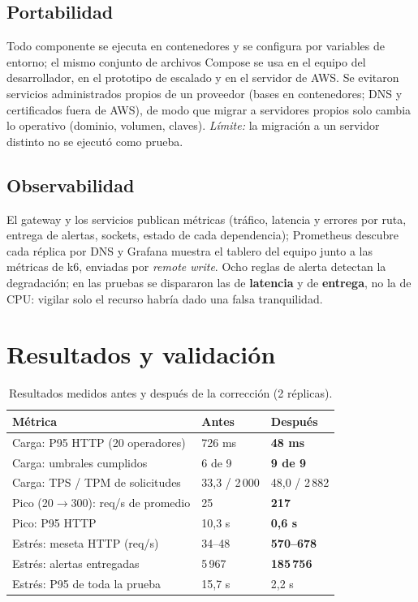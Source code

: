 \documentclass[conference]{IEEEtran}
\begin{document}
\subsection{Portabilidad}
Todo componente se ejecuta en contenedores y se configura por variables de entorno; el mismo conjunto de archivos Compose se usa en el equipo del desarrollador, en el prototipo de escalado y en
el servidor de AWS. Se evitaron servicios administrados propios de un proveedor (bases en contenedores; DNS y certificados fuera de AWS), de modo que migrar a servidores propios solo cambia
lo operativo (dominio, volumen, claves). \emph{Límite:} la migración a un servidor distinto no se ejecutó como prueba.

\subsection{Observabilidad}
El gateway y los servicios publican métricas (tráfico, latencia y errores por ruta, entrega de alertas, sockets, estado de cada dependencia); Prometheus descubre cada réplica por DNS y Grafana
muestra el tablero del equipo junto a las métricas de k6, enviadas por \emph{remote write}. Ocho reglas de alerta detectan la degradación; en las pruebas se dispararon las de \textbf{latencia} y de
\textbf{entrega}, no la de CPU: vigilar solo el recurso habría dado una falsa tranquilidad.

\section{Resultados y validación}
\begin{table}[t]
\centering\caption{Resultados medidos antes y después de la corrección (2 réplicas).}\label{tab:res}
\footnotesize
\begin{tabular}{@{}p{3.55cm}p{1.9cm}p{1.9cm}@{}}
\toprule
\textbf{Métrica} & \textbf{Antes} & \textbf{Después} \\
\midrule
Carga: P95 HTTP (20 operadores) & 726 ms & \textbf{48 ms} \\
Carga: umbrales cumplidos & 6 de 9 & \textbf{9 de 9} \\
Carga: TPS / TPM de solicitudes & 33,3 / 2\,000 & 48,0 / 2\,882 \\
Pico (20$\rightarrow$300): req/s de promedio & 25 & \textbf{217} \\
Pico: P95 HTTP & 10,3 s & \textbf{0,6 s} \\
Estrés: meseta HTTP (req/s) & 34--48 & \textbf{570--678} \\
Estrés: alertas entregadas & 5\,967 & \textbf{185\,756} \\
Estrés: P95 de toda la prueba & 15,7 s & 2,2 s \\
\bottomrule
\end{tabular}
\end{table}
\end{document}
